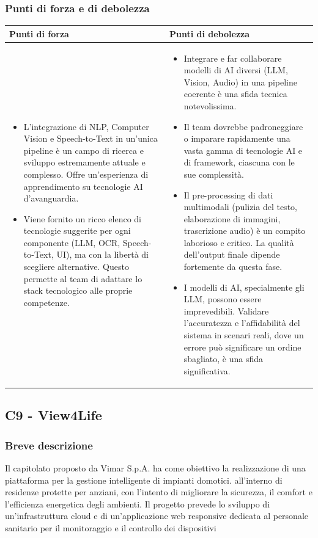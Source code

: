 \documentclass[a4paper,11pt]{article}
\begin{document}
\subsubsection{Punti di forza e di debolezza}

{\footnotesize
\begin{tabularx}{\textwidth}{|X|X|}
\hline
\rowcolor{lightgray!40} %
\textbf{Punti di forza} & \textbf{Punti di debolezza} \\
\hline
\begin{itemize}
\item L'integrazione di NLP, Computer Vision e Speech-to-Text in un'unica pipeline è un campo di ricerca e sviluppo estremamente attuale e complesso. Offre un'esperienza di apprendimento su tecnologie AI d'avanguardia.
\item Viene fornito un ricco elenco di tecnologie suggerite per ogni componente (LLM, OCR, Speech-to-Text, UI), ma con la libertà di scegliere alternative. Questo permette al team di adattare lo stack tecnologico alle proprie competenze.
\end{itemize}
 & \begin{itemize}
\item Integrare e far collaborare modelli di AI diversi (LLM, Vision, Audio) in una pipeline coerente è una sfida tecnica notevolissima.
\item Il team dovrebbe padroneggiare o imparare rapidamente una vasta gamma di tecnologie AI e di framework, ciascuna con le sue complessità.
\item Il pre-processing di dati multimodali (pulizia del testo, elaborazione di immagini, trascrizione audio) è un compito laborioso e critico. La qualità dell'output finale dipende fortemente da questa fase.
\item I modelli di AI, specialmente gli LLM, possono essere imprevedibili. Validare l'accuratezza e l'affidabilità del sistema in scenari reali, dove un errore può significare un ordine sbagliato, è una sfida significativa.
\end{itemize} \\
\hline
\end{tabularx}
}


\newpage
\subsection{C9 - View4Life}
\subsubsection{Breve descrizione}
\parbox[t]{\linewidth}{%
Il capitolato proposto da Vimar S.p.A. ha come obiettivo la realizzazione di una piattaforma per la gestione intelligente di impianti domotici. all'interno di residenze protette per anziani, con l'intento di migliorare la sicurezza, il comfort e l'efficienza energetica degli ambienti. Il progetto prevede lo sviluppo di un'infrastruttura cloud e di un'applicazione web responsive dedicata al personale sanitario per il monitoraggio e il controllo dei dispositivi
}
\end{document}
